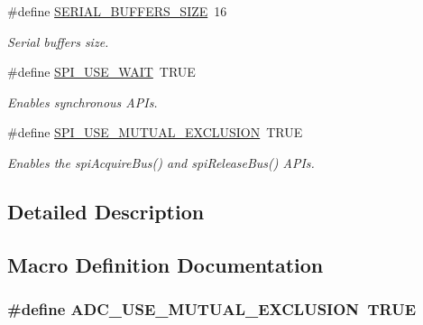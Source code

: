 \begin{DoxyCompactItemize}
\#define \hyperlink{group___h_a_l___c_o_n_f_ga81a9fb00c7a1ce0fe70f263d8fd820e8}{S\+E\+R\+I\+A\+L\+\_\+\+B\+U\+F\+F\+E\+R\+S\+\_\+\+S\+I\+Z\+E}~16
\begin{DoxyCompactList}\small\item\em Serial buffers size. \end{DoxyCompactList}\item 
\#define \hyperlink{group___h_a_l___c_o_n_f_ga0c9ab1488423fa10a22f506c6e74b563}{S\+P\+I\+\_\+\+U\+S\+E\+\_\+\+W\+A\+I\+T}~T\+R\+U\+E
\begin{DoxyCompactList}\small\item\em Enables synchronous A\+P\+Is. \end{DoxyCompactList}\item 
\#define \hyperlink{group___h_a_l___c_o_n_f_ga36d1818f9631f955f7cc94629b1d5498}{S\+P\+I\+\_\+\+U\+S\+E\+\_\+\+M\+U\+T\+U\+A\+L\+\_\+\+E\+X\+C\+L\+U\+S\+I\+O\+N}~T\+R\+U\+E
\begin{DoxyCompactList}\small\item\em Enables the {\ttfamily spi\+Acquire\+Bus()} and {\ttfamily spi\+Release\+Bus()} A\+P\+Is. \end{DoxyCompactList}\end{DoxyCompactItemize}


\subsection{Detailed Description}


\subsection{Macro Definition Documentation}
\hypertarget{group___h_a_l___c_o_n_f_gac0893cb47e338c2dabad34b974a0a88d}{}
\subsubsection[{A\+D\+C\+\_\+\+U\+S\+E\+\_\+\+M\+U\+T\+U\+A\+L\+\_\+\+E\+X\+C\+L\+U\+S\+I\+O\+N}]{\setlength{\rightskip}{0pt plus 5cm}\#define A\+D\+C\+\_\+\+U\+S\+E\+\_\+\+M\+U\+T\+U\+A\+L\+\_\+\+E\+X\+C\+L\+U\+S\+I\+O\+N~T\+R\+U\+E}\label{group___h_a_l___c_o_n_f_gac0893cb47e338c2dabad34b974a0a88d}


